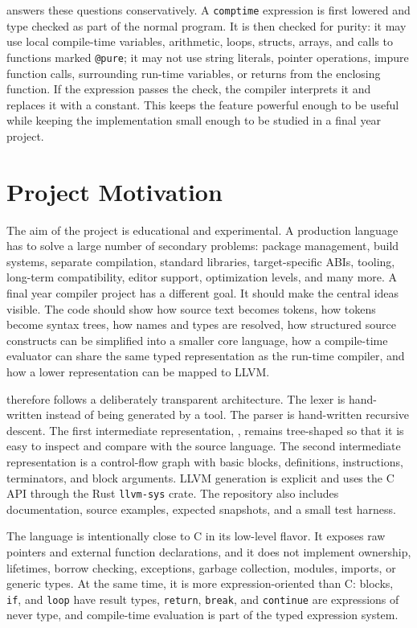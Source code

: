\epl{} answers these questions conservatively. A \texttt{comptime} expression is
first lowered and type checked as part of the normal program. It is then checked
for purity: it may use local compile-time variables, arithmetic, loops, structs,
arrays, and calls to functions marked \texttt{@pure}; it may not use string
literals, pointer operations, impure function calls, surrounding run-time
variables, or returns from the enclosing function. If the expression passes the
check, the compiler interprets it and replaces it with a constant. This keeps the
feature powerful enough to be useful while keeping the implementation small
enough to be studied in a final year project.

\section{Project Motivation}

The aim of the project is educational and experimental. A production language has
to solve a large number of secondary problems: package management, build
systems, separate compilation, standard libraries, target-specific ABIs,
tooling, long-term compatibility, editor support, optimization levels, and many
more. A final year compiler project has a different goal. It should make the
central ideas visible. The code should show how source text becomes tokens, how
tokens become syntax trees, how names and types are resolved, how structured
source constructs can be simplified into a smaller core language, how a
compile-time evaluator can share the same typed representation as the run-time
compiler, and how a lower representation can be mapped to LLVM.

\epl{} therefore follows a deliberately transparent architecture. The lexer is
hand-written instead of being generated by a tool. The parser is hand-written
recursive descent. The first intermediate representation, \irtree{}, remains
tree-shaped so that it is easy to inspect and compare with the source language.
The second intermediate representation is a control-flow graph with basic
blocks, definitions, instructions, terminators, and block arguments. LLVM
generation is explicit and uses the C API through the Rust \texttt{llvm-sys}
crate. The repository also includes documentation, source examples, expected
\irtree{} snapshots, and a small test harness.

The language is intentionally close to C in its low-level flavor. It exposes raw
pointers and external function declarations, and it does not implement ownership,
lifetimes, borrow checking, exceptions, garbage collection, modules, imports, or
generic types. At the same time, it is more expression-oriented than C: blocks,
\texttt{if}, and \texttt{loop} have result types, \texttt{return},
\texttt{break}, and \texttt{continue} are expressions of never type, and
compile-time evaluation is part of the typed expression system.

